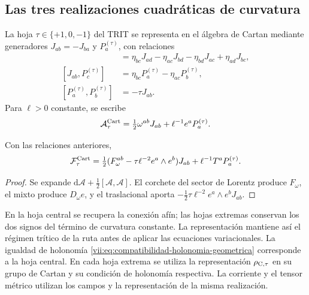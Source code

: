 \subsection{Las tres realizaciones cuadráticas de curvatura}

La hoja \(\tau\in\{+1,0,-1\}\) del TRIT se representa en
el álgebra de Cartan mediante generadores \(J_{ab}=-J_{ba}\)
y \(P_a^{(\tau)}\), con relaciones
\begin{align*}
 [J_{ab},J_{cd}]&=
 \eta_{bc}J_{ad}-\eta_{ac}J_{bd}
 -\eta_{bd}J_{ac}+\eta_{ad}J_{bc},\\
 [J_{ab},P_c^{(\tau)}]&=
 \eta_{bc}P_a^{(\tau)}-\eta_{ac}P_b^{(\tau)},\\
 [P_a^{(\tau)},P_b^{(\tau)}]&=-\tau J_{ab}.
\end{align*}
Para \(\ell>0\) constante, se escribe
\[
 \mathcal A_\tau^{\rm Cart}
 =\tfrac12\omega^{ab}J_{ab}+\ell^{-1}e^aP_a^{(\tau)}.
\]

\begin{proposition}
\label{vii:prop:curvatura-tritificada}
Con las relaciones anteriores,
\begin{equation}
 \mathcal F_\tau^{\rm Cart}
 =\tfrac12(F_\omega^{ab}-\tau\ell^{-2}e^a\wedge e^b)J_{ab}
     +\ell^{-1}T^aP_a^{(\tau)}.
 \label{vii:eq:curvatura-tritificada}
\end{equation}
\end{proposition}
\begin{proof}
Se expande \(\mathrm d\mathcal A+\tfrac12[\mathcal A,\mathcal A]\).
El corchete del sector de Lorentz produce \(F_\omega\), el
mixto produce \(D_\omega e\), y el traslacional aporta
\(-\tfrac12\tau\ell^{-2}e^a\wedge e^bJ_{ab}\).
\end{proof}

En la hoja central se recupera la conexión afín; las hojas extremas
conservan los dos signos del término de curvatura constante. La
representación mantiene así el régimen trítico de la ruta antes de
aplicar las ecuaciones variacionales. La igualdad de holonomía
\eqref{vii:eq:compatibilidad-holonomia-geometrica} corresponde a la
hoja central. En cada hoja extrema se utiliza la representación
\(\rho_{{\rm C},\tau}\) en su grupo de Cartan y su condición
de holonomía respectiva. La corriente y el tensor métrico utilizan
los campos y la representación de la misma realización.
